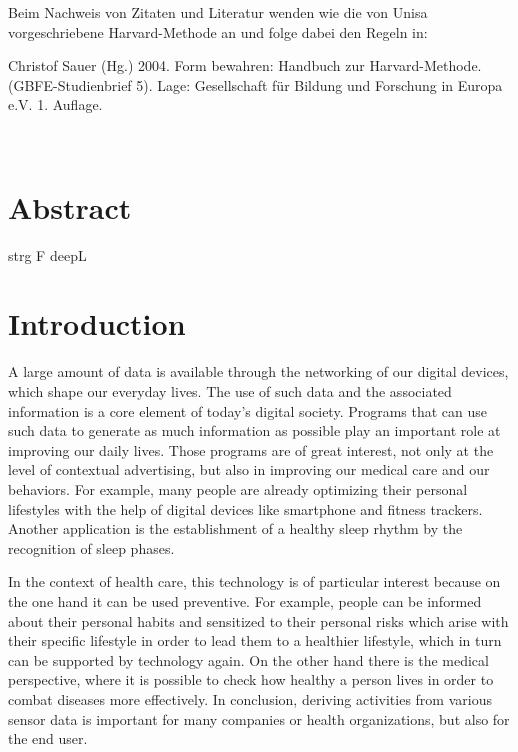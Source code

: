 \documentclass[a4paper,12pt]{scrartcl}
\begin{document}
\begin{singlespace}
\begin{titlepage}
\flushleft
\end{titlepage}

\newpage  \tableofcontents \thispagestyle{empty} \vspace{15mm}
\begin{center}
	\parbox{.8\linewidth}{\begin{small}
			{Beim Nachweis von Zitaten und Literatur wenden wie die von Unisa 
				vorgeschriebene Harvard-Methode an und folge dabei den Regeln 
				in: 
				
				Christof Sauer (Hg.) 2004. 
				Form bewahren: Handbuch zur 
				Harvard-Methode. 
				(GBFE-Studienbrief 5). Lage: Gesellschaft für 
				Bildung und Forschung in Europa e.V. 1. Auflage.} \\
			
			\end{small}}
\end{center}

\end{singlespace}
\newpage
\setcounter{page}{1}

\section*{Abstract}

strg F deepL

\section{Introduction}
A large amount of data is available through the networking of our digital devices, which shape our everyday lives. The use of such data and the associated information is a core element of today's digital society. Programs that can use such data to generate as much information as possible play an important role at improving our daily lives. Those programs are of great interest, not only at the level of contextual advertising, but also in improving our medical care and our behaviors. For example, many people are already optimizing their personal lifestyles with the help of digital devices like smartphone and fitness trackers. Another application is the establishment of a healthy sleep rhythm by the recognition of sleep phases. 

In the context of health care, this technology is of particular interest because on the one hand it can be used preventive. For example, people can be informed about their personal habits and sensitized to their personal risks which arise with their specific lifestyle in order to lead them to a healthier lifestyle, which in turn can be supported by technology again. On the other hand there is the medical perspective, where it is possible to check how healthy a person lives in order to combat diseases more effectively. In conclusion, deriving activities from various sensor data is important for many companies or health organizations, but also for the end user.
\end{document}
